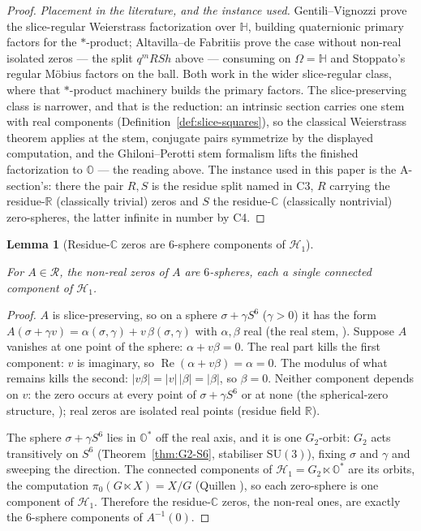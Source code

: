 \documentclass[11pt]{article}
\newcommand{\OO}{\mathbb{O}}
\newcommand{\CC}{\mathbb{C}}
\newcommand{\RR}{\mathbb{R}}
\newcommand{\HH}{\mathbb{H}}
\providecommand{\Gtwo}{G_2}
\providecommand{\lean}[1]{}
\providecommand{\uses}[1]{}
\theoremstyle{plain}
\newtheorem{lemma}[theorem]{Lemma}
\theoremstyle{definition}
\theoremstyle{remark}
\begin{document}
\begin{proof}
\emph{Placement in the literature, and the instance used.} Gentili--Vignozzi
\cite{GV} prove the slice-regular Weierstrass factorization over $\HH$,
building quaternionic primary factors for the $*$-product;
Altavilla--de Fabritiis \cite[Prop.~3.1, Thm.~3.2]{AdFslice} prove the
case without non-real isolated zeros --- the split $q^mRSh$ above ---
consuming \cite{GV} on $\Omega=\HH$ and Stoppato's regular M\"obius
factors on the ball. Both work in the wider slice-regular class, where
that $*$-product machinery builds the primary factors. The
slice-preserving class is narrower, and that is the reduction: an
intrinsic section carries one stem with real components
(Definition~\ref{def:slice-squares}), so the classical Weierstrass
theorem applies at the stem, conjugate pairs symmetrize by the displayed
computation, and the Ghiloni--Perotti stem formalism lifts the finished
factorization to $\OO$ --- the reading above. The instance used in this
paper is the A-section's: there the pair $R,S$ is the residue split named
in \textup{C3}, $R$ carrying the residue-$\RR$ \textup{(}classically
trivial\textup{)} zeros and $S$ the residue-$\CC$ \textup{(}classically
nontrivial\textup{)} zero-spheres, the latter infinite in number by
\textup{C4}.
\end{proof}

\begin{lemma}[Residue-$\CC$ zeros are $6$-sphere components of $\mathcal H_1$]\label{lem:residue-spheres}
\lean{ASection.sphereZero_mem_CResidueZeroLocus,
ASection.mem_CResidueZeroLocus_iff_exists_sphereZero,
G2.exists_smul_eq_of_mem_unitImaginarySphere}
\uses{def:two-worlds, thm:G2-S6, thm:wang}
For $A\in\mathcal R$, the non-real zeros of $A$ are $6$-spheres, each a single connected
component of $\mathcal H_1$.
\end{lemma}
\begin{proof}
$A$ is slice-preserving, so on a sphere $\sigma+\gamma S^6$ \textup{(}$\gamma>0$\textup{)} it has
the form $A(\sigma+\gamma v)=\alpha(\sigma,\gamma)+v\,\beta(\sigma,\gamma)$ with $\alpha,\beta$
real (the real stem, \cite{Wang}). Suppose $A$ vanishes at one point of the
sphere: $\alpha+v\beta=0$. The real part kills the first component: $v$ is
imaginary, so $\operatorname{Re}(\alpha+v\beta)=\alpha=0$. The modulus of what
remains kills the second: $|v\beta|=|v|\,|\beta|=|\beta|$, so $\beta=0$.
Neither component depends on $v$: the zero occurs at every point of
$\sigma+\gamma S^6$ or at none (the spherical-zero structure, \cite{AdF});
real zeros are isolated real points (residue field $\RR$).

The sphere $\sigma+\gamma S^6$ lies in $\OO^{*}$ off the real axis, and it is
one $\Gtwo$-orbit: $\Gtwo$ acts transitively on $S^6$
(Theorem~\ref{thm:G2-S6}, stabiliser $\mathrm{SU}(3)$), fixing $\sigma$ and
$\gamma$ and sweeping the direction. The connected components of
$\mathcal H_1=\Gtwo\ltimes\OO^{*}$ are its orbits, the computation
$\pi_0(G\ltimes X)=X/G$ (Quillen \cite[\S1]{Quillen73}), so each
zero-sphere is one component of $\mathcal H_1$. Therefore the residue-$\CC$
zeros, the non-real ones, are exactly the $6$-sphere components of
$A^{-1}(0)$.
\end{proof}
\end{document}
